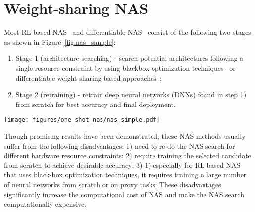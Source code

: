 \documentclass{article}
\begin{document}



\newpage
\onecolumn
\appendix

\section{Weight-sharing NAS}
\label{app:one_shot_nas}

Most  RL-based NAS~\citep[e.g.,][]{zoph2016neural} and differentiable NAS~\citep{liu2018darts, cai2018proxylessnas} 
consist of the following two stages as shown in Figure~\ref{fig:nas_sample}: 
\begin{enumerate}
\item[1)]  Stage 1 (architecture searching) - 
search potential architectures following a single resource constraint by using blackbox optimization techniques~\citep[e.g.,][]{zoph2016neural} or differentiable weight-sharing based approaches~\citep[e.g.,][]{liu2018darts, cai2018proxylessnas}; 
 \item[2)] Stage 2 (retraining) - retrain deep neural networks (DNNs) found in step 1) from scratch for best accuracy and final deployment.
\end{enumerate}

\begin{figure*}[h]
    \centering
    \texttt{[image: figures/one\_shot\_nas/nas\_simple.pdf]}
    \caption{An overview of convectional NAS pipeline.}
    \label{fig:nas_sample}
\end{figure*}


Though promising results have been demonstrated, these NAS methods usually suffer from the following disadvantages: 
1) need to re-do the NAS search for different hardware resource constraints; 
2) require training the selected candidate from scratch to achieve desirable accuracy; 
3) 1) especially for RL-based NAS that uses black-box optimization techniques, it requires training a large number of neural networks from scratch or on proxy tasks; 
These disadvantages significantly increase the computational cost of NAS and make the NAS search computationally expensive.
\end{document}
